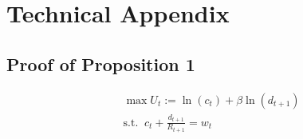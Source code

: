 
\chapter{Technical Appendix} %

\label{Appendix} %


\section{Proof of Proposition 1}

\begin{align*}
    &\max U_t:= \ln(c_t) + \beta\ln(d_{t+1}) \\
    &\text{s.t. } \ c_t + \frac{d_{t+1}}{R_{t+1}} = w_t
\end{align*}